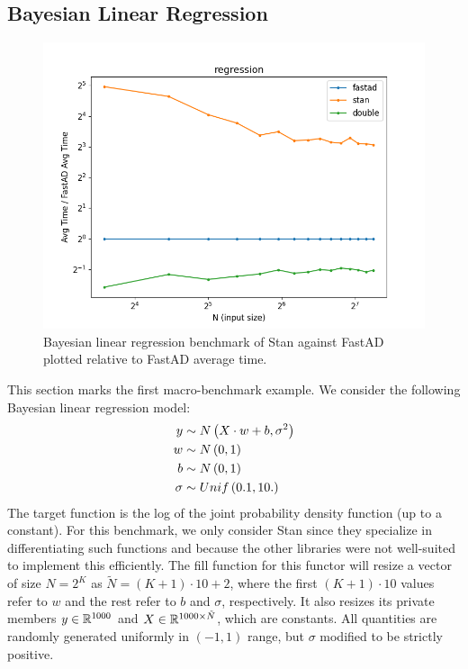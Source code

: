 \subsection{Bayesian Linear Regression}\label{ssec:regression}

\begin{figure}[t]
    \centering
    \includegraphics[width=\textwidth]{figs/regression_fig.png}
    \caption{%
        Bayesian linear regression benchmark of Stan against FastAD 
        plotted relative to FastAD average time.
    }\label{fig:regression}
\end{figure}

This section marks the first macro-benchmark example.
We consider the following Bayesian linear regression model:
\begin{align*}
    y &\sim N\left(X\cdot w + b, \sigma^2\right) \\
    w &\sim N\left(0,1\right) \\
    b &\sim N\left(0,1\right) \\
    \sigma &\sim Unif\left(0.1, 10.\right)
\end{align*}
The target function is the log of the joint probability density function (up to a constant).
For this benchmark, we only consider Stan since they specialize in differentiating such functions
and because the other libraries were not well-suited to implement this efficiently.
The fill function for this functor will resize a vector of size $N = 2^K$ as $\tilde{N} = (K + 1) \cdot 10 + 2$,
where the first $(K+1) \cdot 10$ values refer to $w$ and the rest refer to $b$ and $\sigma$, respectively.
It also resizes its private members $y \in \mathbb{R}^{1000}$ and $X \in \mathbb{R}^{1000 \times \tilde{N}}$, which are constants.
All quantities are randomly generated uniformly in $(-1,1)$ range,
but $\sigma$ modified to be strictly positive.

